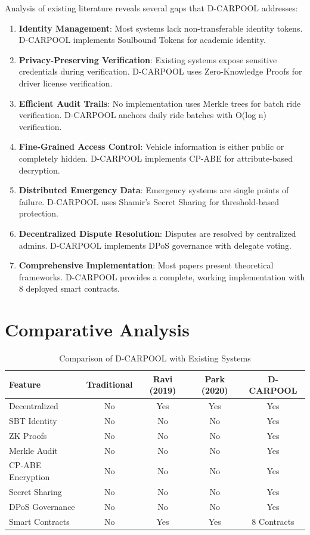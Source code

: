 \documentclass[12pt]{report}
\theoremstyle{plain}
\theoremstyle{definition}
\theoremstyle{remark}
\begin{document}
Analysis of existing literature reveals several gaps that D-CARPOOL addresses:

\begin{enumerate}
    \item \textbf{Identity Management}: Most systems lack non-transferable identity tokens. D-CARPOOL implements Soulbound Tokens for academic identity.
    
    \item \textbf{Privacy-Preserving Verification}: Existing systems expose sensitive credentials during verification. D-CARPOOL uses Zero-Knowledge Proofs for driver license verification.
    
    \item \textbf{Efficient Audit Trails}: No implementation uses Merkle trees for batch ride verification. D-CARPOOL anchors daily ride batches with O(log n) verification.
    
    \item \textbf{Fine-Grained Access Control}: Vehicle information is either public or completely hidden. D-CARPOOL implements CP-ABE for attribute-based decryption.
    
    \item \textbf{Distributed Emergency Data}: Emergency systems are single points of failure. D-CARPOOL uses Shamir's Secret Sharing for threshold-based protection.
    
    \item \textbf{Decentralized Dispute Resolution}: Disputes are resolved by centralized admins. D-CARPOOL implements DPoS governance with delegate voting.
    
    \item \textbf{Comprehensive Implementation}: Most papers present theoretical frameworks. D-CARPOOL provides a complete, working implementation with 8 deployed smart contracts.
\end{enumerate}

\section{Comparative Analysis}

\begin{table}[H]
\centering
\caption{Comparison of D-CARPOOL with Existing Systems}
\begin{tabular}{|l|c|c|c|c|}
\hline
\textbf{Feature} & \textbf{Traditional} & \textbf{Ravi (2019)} & \textbf{Park (2020)} & \textbf{D-CARPOOL} \\
\hline
Decentralized & No & Yes & Yes & Yes \\
SBT Identity & No & No & No & Yes \\
ZK Proofs & No & No & No & Yes \\
Merkle Audit & No & No & No & Yes \\
CP-ABE Encryption & No & No & No & Yes \\
Secret Sharing & No & No & No & Yes \\
DPoS Governance & No & No & No & Yes \\
Smart Contracts & No & Yes & Yes & 8 Contracts \\
\hline
\end{tabular}
\end{table}
\end{document}
